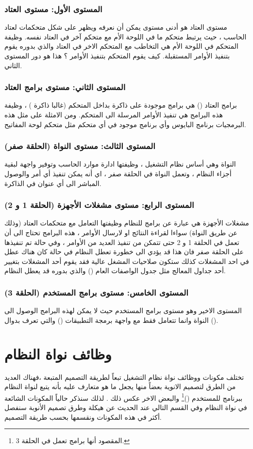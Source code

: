 \documentclass[document.tex]{subfiles}
\begin{document}
\subsubsection{المستوى الأول: مستوى العتاد}
مستوى العتاد هو أدنى مستوى يمكن أن نعرفه ويظهر على شكل متحكمات لعتاد الحاسب ، حيث يرتبط متحكم ما في اللوحة الأم مع متحكم آخر في العتاد نفسه. وظيفة المتحكم في اللوحة الأم هي التخاطب مع المتحكم الاخر في العتاد والذي بدوره يقوم بتنفيذ الأوامر المستقبلة.
كيف يقوم المتحكم بتنفيذ الأوامر ؟ هذا هو دور المستوى الثاني.
\subsubsection{المستوى الثاني: مستوى برامج العتاد }
برامج العتاد () هي برامج موجودة على ذاكرة بداخل المتحكم (غالبا ذاكرة ) ، وظيفة هذه البرامج هي تنفيذ الأوامر المرسلة الى المتحكم. ومن الامثلة على مثل هذه البرمجيات برنامج البايوس وأي برنامج موجود في أي متحكم مثل متحكم لوحة المفاتيح.
\subsubsection{المستوى الثالث: مستوى النواة (الحلقة صفر)}
النواة وهي أساس نظام التشغيل ، وظيفتها ادارة موارد الحاسب وتوفير واجهة لبقية أجزاء النظام ، وتعمل النواة في الحلقة صفر ، اي أنه يمكن تنفيذ أي أمر والوصول المباشر الى أي عنوان في الذاكرة.
\subsubsection{المستوى الرابع: مستوى مشغلات الأجهزة (الحلقة 1 و 2)}
مشغلات الأجهزة هي عبارة عن برامج للنظام وظيفتها التعامل مع متحكمات العتاد (وذلك عن طريق النواة) سواءا لقراءة النتائج او لارسال الأوامر ، هذه البرامج تحتاج الى أن تعمل في الحلقة 1 و 2 حتى تتمكن من تنفيذ العديد من الأوامر ، وفي حالة تم تنفيذها على الحلقة صفر فان هذا قد يؤدي الى خطورة تعطل النظام في حالة كان هناك عطل في احد المشغلات كذلك ستكون صلاحيات المشغل عالية فقد يقوم أحد المشغلات بتغيير أحد جداول المعالج مثل جدول الواصفات العام () والذي بدوره قد يعطل النظام.
\subsubsection{المستوى الخامس: مستوى برامج المستخدم (الحلقة 3)}
المستوى الاخير وهو مستوى برامج المستخدم حيث لا يمكن لهذه البرامج الوصول الى النواة وانما تتعامل فقط مع واجهة برمجة التطبيقات () والتي تعرف بدوال ().

\section{وظائف نواة النظام}
تختلف مكونات ووظائف نواة نظام التشغيل تبعاً لطريقة التصميم المتبعة ،فهناك العديد من الطرق لتصميم الانوية  بعضاً منها يجعل ما هو متعارف عليه بأنه يتبع لنواة النظام ببرنامج للمستخدم ()\footnote{المقصود أنها برامج تعمل في الحلقة 3.} والبعض الاخر عكس ذلك . لذلك سنذكر حالياً المكونات الشائعة في نواة النظام وفي القسم التالي عند الحديث عن هيكلة وطرق تصميم الأنوبة سنفصل أكثر في هذه المكونات ونقسمها بحسب طريقة التصميم.
\end{document}
